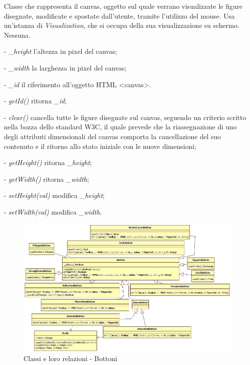 Classe che rappresenta il canvas, oggetto sul quale verrano visualizzate le figure disegnate, modificate e spostate dall'utente, tramite l'utilizzo del mouse. 
Usa un'istanza di \textit{Visualization}, che si occupa della sua visualizzazione su schermo.
Nessuna.
\begin{elencopuntato}[\subsubsecindent]
\item[-] \textit{{\_}height} l'altezza in pixel del canvas;
\item[-] \textit{{\_}width} la larghezza in pixel del canvas;
\item[-] \textit{{\_}id} il riferimento all'oggetto HTML <canvas>.
\end{elencopuntato}
\begin{elencopuntato}[\subsubsecindent]
\item[-] \textit{getId()} ritorna  \textit{{\_}id};
\item[-] \textit{clear()} cancella tutte le figure disegnate sul canvas, seguendo un criterio scritto nella bozza dello standard W3C, il quale prevede che la riassegnazione di uno degli attributi dimensionali del canvas comporta la cancellazione del suo contenuto e il ritorno allo stato iniziale con le nuove dimensioni;
\item[-] \textit{getHeight()} ritorna  \textit{{\_}height};
\item[-] \textit{getWidth()} ritorna  \textit{{\_}width};
\item[-] \textit{setHeight(val)} modifica \textit{{\_}height};
\item[-] \textit{setWidth(val)} modifica \textit{{\_}width}.
\end{elencopuntato}
\newpage


\begin{figure}[!ht]
\centering
\includegraphics[scale=0.5]{button.jpg}
\caption{Classi e loro relazioni - Bottoni}
\end{figure}

